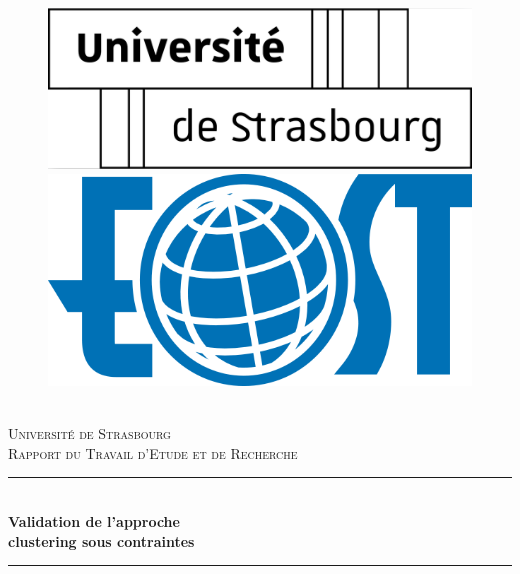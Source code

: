 \documentclass[11pt, openany]{report}
\newcommand{\HRule}{\rule{\linewidth}{0.5mm}}
\begin{document}
\begin{titlepage}
  \begin{sffamily}
  \begin{center}


\begin{figure}[h!]
  \begin{minipage}{0.48\textwidth}
   \centering
  \includegraphics[width=0.6\linewidth,left]{unistra.png}
  \end{minipage}\hfill
  \begin{minipage}{0.48\textwidth}
   \centering
  \includegraphics[width=0.6\linewidth,right]{eost.png}
  \end{minipage}
\end{figure}


    \textsc{\LARGE \\
Université de Strasbourg}\\[3cm]

    \textsc{\Large Rapport du Travail d'Etude et de Recherche}\\[1.5cm]

    \HRule \\[0.4cm]
    { \Huge \bfseries
Validation de l’approche \\ clustering sous contraintes \\[0.4cm] }

\HRule \\[2cm]
	  	

\end{center}
\end{sffamily}
\end{titlepage}
\end{document}
